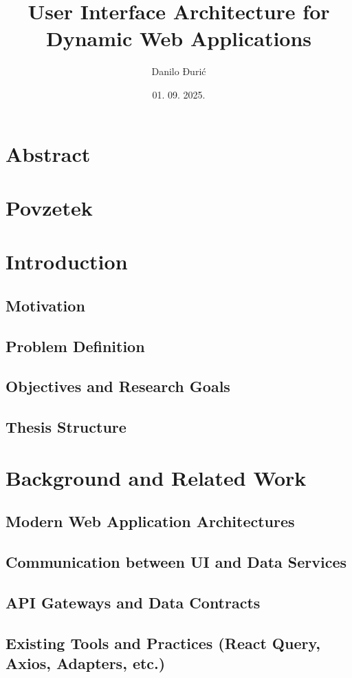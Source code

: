 \documentclass[12pt,a4paper]{article}
\title{User Interface Architecture for Dynamic Web Applications}
\author{Danilo Đurić}
\date{01. 09. 2025. }
\begin{document}
\maketitle

\tableofcontents

\section*{Abstract} %
\section*{Povzetek} %

\section{Introduction} %
  \subsection{Motivation}
  \subsection{Problem Definition}
  \subsection{Objectives and Research Goals}
  \subsection{Thesis Structure}

\section{Background and Related Work} %
  \subsection{Modern Web Application Architectures}
  \subsection{Communication between UI and Data Services}
  \subsection{API Gateways and Data Contracts}
  \subsection{Existing Tools and Practices (React Query, Axios, Adapters, etc.)}
\end{document}
